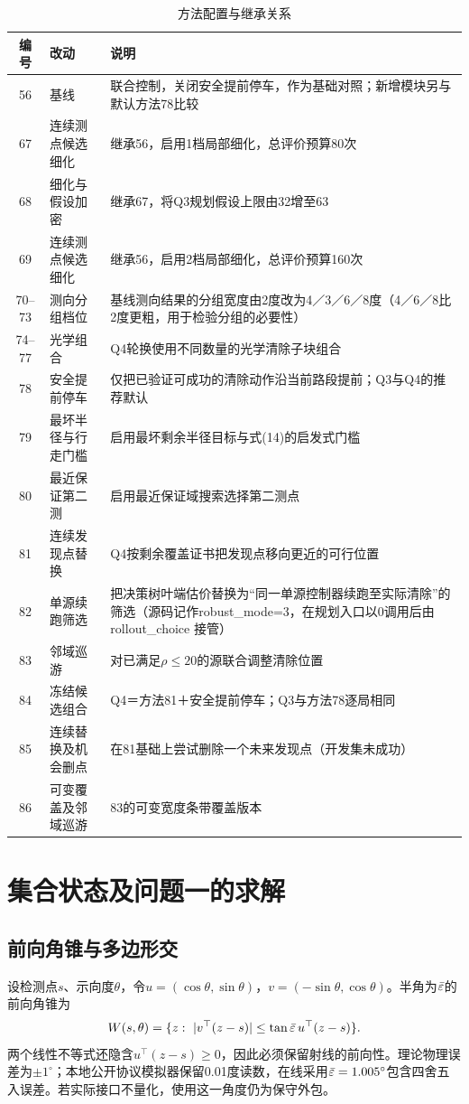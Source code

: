 \documentclass[UTF8,a4paper,zihao=-4,fontset=fandol]{ctexart}
\begin{document}
\begin{table}[!htbp]\centering\small\caption{方法配置与继承关系}\label{tab:methodindex}
\begin{tabular}{clp{6.3cm}}\toprule 编号&改动&说明\\\midrule
56&基线&联合控制，关闭安全提前停车，作为基础对照；新增模块另与默认方法78比较\\
67&连续测点候选细化&继承56，启用1档局部细化，总评价预算80次\\
68&细化与假设加密&继承67，将Q3规划假设上限由32增至63\\
69&连续测点候选细化&继承56，启用2档局部细化，总评价预算160次\\
70--73&测向分组档位&基线测向结果的分组宽度由2度改为4／3／6／8度（4／6／8比2度更粗，用于检验分组的必要性）\\
74--77&光学组合&Q4轮换使用不同数量的光学清除子块组合\\
78&安全提前停车&仅把已验证可成功的清除动作沿当前路段提前；Q3与Q4的推荐默认\\
79&最坏半径与行走门槛&启用最坏剩余半径目标与式(14)的启发式门槛\\
80&最近保证第二测&启用最近保证域搜索选择第二测点\\
81&连续发现点替换&Q4按剩余覆盖证书把发现点移向更近的可行位置\\
82&单源续跑筛选&把决策树叶端估价替换为“同一单源控制器续跑至实际清除”的筛选（源码记作robust\_mode=3，在规划入口以0调用后由 rollout\_choice 接管）\\
83&邻域巡游&对已满足$\rho\le20$的源联合调整清除位置\\
84&冻结候选组合&Q4＝方法81＋安全提前停车；Q3与方法78逐局相同\\
85&连续替换及机会删点&在81基础上尝试删除一个未来发现点（开发集未成功）\\
86&可变覆盖及邻域巡游&83的可变宽度条带覆盖版本\\\bottomrule\end{tabular}\end{table}

\section{集合状态及问题一的求解}
\subsection{前向角锥与多边形交}
设检测点$s$、示向度$\theta$，令$u=(\cos\theta,\sin\theta)$，$v=(-\sin\theta,\cos\theta)$。半角为$\bar\varepsilon$的前向角锥为
\begin{equation}
 W(s,\theta)=\{z:\ |v^\top(z-s)|\le \tan\bar\varepsilon\,u^\top(z-s)\}.
\end{equation}
两个线性不等式还隐含$u^\top(z-s)\ge0$，因此必须保留射线的前向性。理论物理误差为$\pm1^\circ$；本地公开协议模拟器保留0.01度读数，在线采用$\bar\varepsilon=1.005^\circ$包含四舍五入误差。若实际接口不量化，使用这一角度仍为保守外包。
\end{document}
